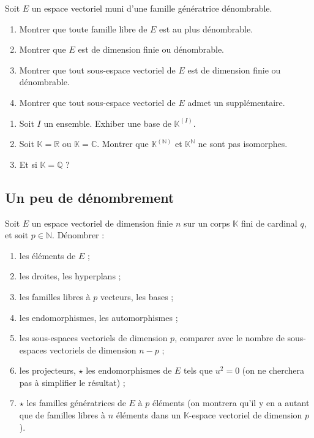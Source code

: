 \documentclass[french]{article}
\newcommand{\N}{\mathbb{N}}
\newcommand{\Q}{\mathbb{Q}}
\newcommand{\R}{\mathbb{R}}
\newcommand{\C}{\mathbb{C}}
\newcommand{\K}{\mathbb{K}}
\theoremstyle{plain}
\theoremstyle{definition}
\theoremstyle{remark}
\begin{document}
\begin{exo}
	Soit $E$ un espace vectoriel muni d'une famille génératrice dénombrable.
	\begin{enumerate}
		\item Montrer que toute famille libre de $E$ est au plus dénombrable.
		\item Montrer que $E$ est de dimension finie ou dénombrable.
		\item Montrer que tout sous-espace vectoriel de $E$ est de dimension finie ou dénombrable.
		\item Montrer que tout sous-espace vectoriel de $E$ admet un supplémentaire.
	\end{enumerate}
\end{exo}

\begin{exo}
	\begin{enumerate}
		\item Soit $I$ un ensemble. Exhiber une base de $\K^{(I)}$.
		\item Soit $\K=\R$ ou $\K=\C$. Montrer que $\K^{(\N)}$ et $\K^\N$ ne sont pas isomorphes.
		\item Et si $\K=\Q$ ?
	\end{enumerate}
\end{exo}

\subsection{Un peu de dénombrement}

Soit $E$ un espace vectoriel de dimension finie $n$ sur un corps $\K$ fini de cardinal $q$, et soit $p\in\N$. Dénombrer :
\begin{enumerate}
	\item les éléments de $E$ ;
	\item les droites, les hyperplans ;
	\item les familles libres à $p$ vecteurs, les bases ;
	\item les endomorphismes, les automorphismes ;
	\item les sous-espaces vectoriels de dimension $p$, comparer avec le nombre de sous-espaces vectoriels de dimension $n-p$ ;
	\item les projecteurs, $\star$ les endomorphismes de $E$ tels que $u^2=0$ (on ne cherchera pas à simplifier le résultat) ;
	\item $\star$ les familles génératrices de $E$ à $p$ éléments (on montrera qu'il y en a autant que de familles libres à $n$ éléments dans un $\K$-espace vectoriel de dimension $p$).
\end{enumerate}
	
\end{document}
